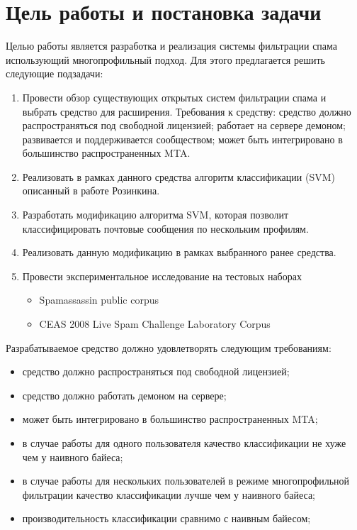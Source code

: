 \newpage
\section{Цель работы и постановка задачи}

Целью работы является разработка и реализация системы фильтрации спама использующий многопрофильный подход.
Для этого предлагается решить следующие подзадачи:
\begin{enumerate}
\item  Провести обзор существующих открытых систем фильтрации спама и выбрать средство для расширения. Требования к средству:
средство должно распространяться под свободной лицензией;
работает на сервере демоном;
развивается и поддерживается сообществом;
может быть интегрировано в большинство распространенных MTA.
\item Реализовать в рамках данного средства алгоритм классификации (SVM) описанный в работе Розинкина.
\item Разработать модификацию алгоритма SVM, которая позволит классифицировать почтовые сообщения по нескольким профилям.
\item Реализовать данную модификацию в рамках выбранного ранее средства.
\item Провести экспериментальное исследование на тестовых наборах
\begin{itemize}
    \item Spamassassin public corpus
    \item CEAS 2008 Live Spam Challenge Laboratory Corpus
\end{itemize}
\end{enumerate}

Разрабатываемое средство должно удовлетворять следующим требованиям:
\begin{itemize}
\item средство должно распространяться под свободной лицензией;
\item средство должно работать демоном на сервере;
\item может быть интегрировано в большинство распространенных MTA;
\item в случае работы для одного пользователя качество классификации не хуже чем у наивного байеса;
\item в случае работы для нескольких пользователей в режиме многопрофильной фильтрации качество классификации лучше чем у наивного байеса;
\item производительность классификации сравнимо с наивным байесом;
\end{itemize}
